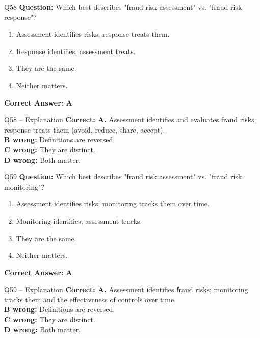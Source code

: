 \documentclass[aspectratio=169,10pt]{beamer}
\begin{document}
	\begin{frame}[t]{Q58}
		\small
		\textbf{Question:} Which best describes "fraud risk assessment" vs. "fraud risk response"?
		\begin{enumerate}[label=\Alph*.,itemsep=1pt,topsep=2pt]
			\item Assessment identifies risks; response treats them.
			\item Response identifies; assessment treats.
			\item They are the same.
			\item Neither matters.
		\end{enumerate}
		\vspace{4pt}
		\textbf{Correct Answer: A}
	\end{frame}
	
	\begin{frame}[t]{Q58 -- Explanation}
		\small
		\textbf{Correct: A.} Assessment identifies and evaluates fraud risks; response treats them (avoid, reduce, share, accept). \\[4pt]
		\textbf{B wrong:} Definitions are reversed. \\[2pt]
		\textbf{C wrong:} They are distinct. \\[2pt]
		\textbf{D wrong:} Both matter.
	\end{frame}
	
	\begin{frame}[t]{Q59}
		\small
		\textbf{Question:} Which best describes "fraud risk assessment" vs. "fraud risk monitoring"?
		\begin{enumerate}[label=\Alph*.,itemsep=1pt,topsep=2pt]
			\item Assessment identifies risks; monitoring tracks them over time.
			\item Monitoring identifies; assessment tracks.
			\item They are the same.
			\item Neither matters.
		\end{enumerate}
		\vspace{4pt}
		\textbf{Correct Answer: A}
	\end{frame}
	
	\begin{frame}[t]{Q59 -- Explanation}
		\small
		\textbf{Correct: A.} Assessment identifies fraud risks; monitoring tracks them and the effectiveness of controls over time. \\[4pt]
		\textbf{B wrong:} Definitions are reversed. \\[2pt]
		\textbf{C wrong:} They are distinct. \\[2pt]
		\textbf{D wrong:} Both matter.
	\end{frame}
	
\end{document}
